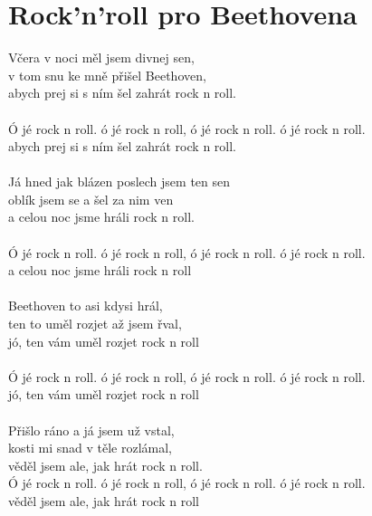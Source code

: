 \section{Rock'n'roll pro Beethovena}
Včera v noci měl jsem divnej sen,\\
v tom snu ke mně přišel Beethoven,\\
abych prej si s ním šel zahrát rock n roll.\\
\\
Ó jé rock n roll. ó jé rock n roll, ó jé rock n roll. ó jé rock n roll.\\
abych prej si s ním šel zahrát rock n roll.\\
\\
Já hned jak blázen poslech jsem ten sen\\
oblík jsem se a šel za nim ven\\
a celou noc jsme hráli rock n roll. \\
\\           
Ó jé rock n roll. ó jé rock n roll, ó jé rock n roll. ó jé rock n roll.\\
a celou noc jsme hráli rock n roll\\
\\
Beethoven to asi kdysi hrál,\\
ten to uměl rozjet až jsem řval,\\
jó, ten vám uměl rozjet rock n roll\\
\\
Ó jé rock n roll. ó jé rock n roll, ó jé rock n roll. ó jé rock n roll.\\
jó, ten vám uměl rozjet rock n roll\\
\\
Přišlo ráno a já jsem už vstal,\\
kosti mi snad v těle rozlámal,\\
věděl jsem ale, jak hrát rock n roll.\\

Ó jé rock n roll. ó jé rock n roll, ó jé rock n roll. ó jé rock n roll.\\
věděl jsem ale, jak hrát rock n roll\\